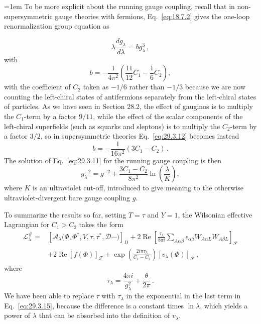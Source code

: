 \begingroup
\emergencystretch=1em
To be more explicit about the running gauge coupling, recall that in
non-super\-sym\-met\-ric gauge theories with fermions,
Eq.~\eqref{eq:18.7.2}
gives the one-loop renormalization group equation as
\par
\endgroup
\begin{equation}
  \lambda\frac{dg_\lambda}{d\lambda}=bg_\lambda^3\,,
  \tag{29.3.11}\label{eq:29.3.11}
\end{equation}
with
\begin{equation}
  b=-\frac{1}{4\pi^2}
  \left(\frac{11}{12}C_1-\frac16 C_2\right),
  \tag{29.3.12}\label{eq:29.3.12}
\end{equation}
with the coefficient of \(C_2\) taken as \(-1/6\) rather than \(-1/3\)
because we are now counting the left-chiral states of antifermions
separately from the left-chiral states of particles. As we have seen in
Section 28.2, the effect of gauginos is to multiply the \(C_1\)-term by a
factor \(9/11\), while the effect of the scalar components of the
left-chiral superfields (such as squarks and sleptons) is to multiply the
\(C_2\)-term by a factor \(3/2\), so in supersymmetric theories
Eq.~\eqref{eq:29.3.12} becomes instead
\begin{equation}
  b=-\frac{1}{16\pi^2}(3C_1-C_2)\,.
  \tag{29.3.13}\label{eq:29.3.13}
\end{equation}
The solution of Eq.~\eqref{eq:29.3.11} for the running gauge coupling is
then
\begin{equation}
  g_\lambda^{-2}
  =
  g^{-2}
  +\frac{3C_1-C_2}{8\pi^2}\ln\left(\frac{\lambda}{K}\right),
  \tag{29.3.14}\label{eq:29.3.14}
\end{equation}
where \(K\) is an ultraviolet cut-off, introduced to give meaning to the
otherwise ultraviolet-divergent bare gauge coupling \(g\).

To summarize the results so far, setting \(T=\tau\) and \(Y=1\), the
Wilsonian effective Lagrangian for \(C_1>C_2\) takes the form
\begin{equation}
  \begin{aligned}
  \mathcal{L}^{\#}_\lambda
  ={}&
  \left[
    \mathcal{A}_\lambda
    \bigl(\Phi,\Phi^\dagger,V,\tau,\tau^*,\mathcal{D}\cdots\bigr)
  \right]_D
  +2\operatorname{Re}
  \left[
    \frac{\tau_\lambda}{8\pi i}
    \sum_{A\alpha\beta}
    \epsilon_{\alpha\beta}W_{A\alpha L}W_{A\beta L}
  \right]_{\mathcal{F}}
  \\
  &+2\operatorname{Re}\left[f(\Phi)\right]_{\mathcal{F}}
  +\exp\left(\frac{2i\pi\tau_\lambda}{C_1-C_2}\right)
  \left[v_\lambda(\Phi)\right]_{\mathcal{F}}\,,
  \end{aligned}
  \tag{29.3.15}\label{eq:29.3.15}
\end{equation}
where
\begin{equation}
  \tau_\lambda=\frac{4\pi i}{g_\lambda^2}+\frac{\theta}{2\pi}\,.
  \tag{29.3.16}\label{eq:29.3.16}
\end{equation}
We have been able to replace \(\tau\) with \(\tau_\lambda\) in the
exponential in the last term in Eq.~\eqref{eq:29.3.15}, because the
difference is a constant times \(\ln\lambda\), which yields a power of
\(\lambda\) that can be absorbed into the definition of \(v_\lambda\).

